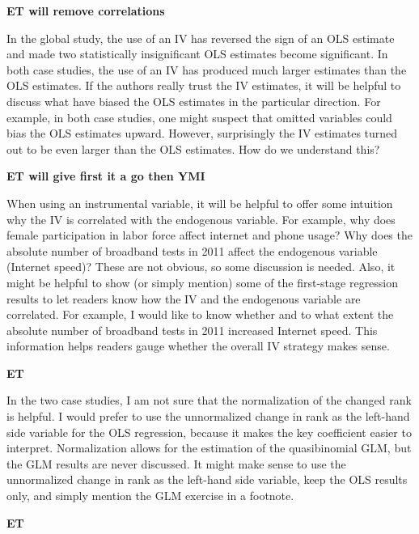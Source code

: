 \documentclass[11pt, a4paper, answers]{exam}
\begin{document}
\begin{questions}
\begin{solution}
\textbf{ET will remove correlations}
\end{solution}

\question In the global study, the use of an IV has reversed the 
sign of an OLS estimate and made two statistically insignificant 
OLS estimates become significant. In both case studies, the use 
of an IV has produced much larger estimates than the OLS 
estimates. If the authors really trust the IV estimates, it will be 
helpful to discuss what have biased the OLS estimates in the 
particular direction. For example, in both case studies, one 
might suspect that omitted variables could bias the OLS 
estimates upward. However, surprisingly the IV estimates 
turned out to be even larger than the OLS estimates. How do 
we understand this?

\begin{solution}
\textbf{ET will give first it a go then YMI }
\end{solution}

\question When using an instrumental variable, it will be 
helpful to offer some intuition why the IV is correlated with 
the endogenous variable. For example, why does female 
participation in labor force affect internet and phone usage? 
Why does the absolute number of broadband tests in 2011 
affect the endogenous variable (Internet speed)? These are 
not obvious, so some discussion is needed. Also, it might be 
helpful to show (or simply mention) some of the first-stage 
regression results to let readers know how the IV and the 
endogenous variable are correlated. For example, I would 
like to know whether and to what extent the absolute number 
of broadband tests in 2011 increased Internet speed. This 
information helps readers gauge whether the overall IV 
strategy makes sense.

\begin{solution}
\textbf{ET}
\end{solution}

\question In the two case studies, I am not sure that the 
normalization of the changed rank is helpful. I would prefer 
to use the unnormalized change in rank as the left-hand 
side variable for the OLS regression, because it makes the 
key coefficient easier to interpret. Normalization allows for 
the estimation of the quasibinomial GLM, but the GLM results 
are never discussed. It might make sense to use the unnormalized 
change in rank as the left-hand side variable, keep the OLS results 
only, and simply mention the GLM exercise in a footnote.

\begin{solution}
\textbf{ET}
\end{solution}

\end{questions}
\end{document}
